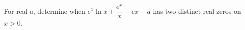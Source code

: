For real $a$, determine when $e^x \ln x + \dfrac{e^x}{x} - e x - a$ has two distinct real zeros on $x>0$.

